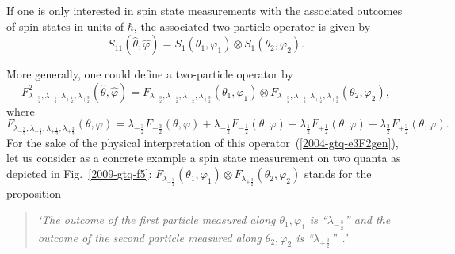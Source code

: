 \documentclass[pra,amsfonts,showpacs,showkeys,preprint]{revtex4}
\begin{document}
If one is only interested in spin state measurements with the associated outcomes of spin states in units of $\hbar$,
the associated two-particle operator is given by
\begin{equation}
 S_{1 1 } ({\hat \theta},{\hat \varphi} ) =
S_{1 }( \theta_1,\varphi_1 )
\otimes
S_{1 }( \theta_2,\varphi_2 ).
\label{2004-gtq-e3F2nat}
\end{equation}

More generally, one could define a two-particle operator by
\begin{equation}
F^2_{\lambda_{-\frac{3}{2}},\lambda_{-\frac{1}{2}}, \lambda_{+\frac{1}{2}}, \lambda_{+\frac{3}{2}} } ({\hat \theta},{\hat \varphi} ) =
F_{\lambda_{-\frac{3}{2}},\lambda_{-\frac{1}{2}}, \lambda_{+\frac{1}{2}}, \lambda_{+\frac{3}{2}} } ( \theta_1,\varphi_1)
\otimes
F_{\lambda_{-\frac{3}{2}},\lambda_{-\frac{1}{2}}, \lambda_{+\frac{1}{2}}, \lambda_{+\frac{3}{2}} } ( \theta_2,\varphi_2 ),
\label{2004-gtq-e3F2gen}
\end{equation}
where
\begin{equation}
F_{\lambda_{-\frac{3}{2}},\lambda_{-\frac{1}{2}}, \lambda_{+\frac{1}{2}}, \lambda_{+\frac{3}{2}} } ( \theta ,\varphi )
=
 \lambda_{-\frac{3}{2}}F_{-\frac{3}{2}}(\theta ,\varphi) +  \lambda_{-\frac{1}{2}} F_{-\frac{1}{2}}(\theta ,\varphi) +
 \lambda_{\frac{1}{2}}F_{+\frac{1}{2}}(\theta ,\varphi)+  \lambda_{\frac{3}{2}}F_{+\frac{3}{2}}(\theta ,\varphi)
.
\label{2004-gtq-e3F2gen2}
\end{equation}
For the sake of the physical interpretation of this operator~(\ref{2004-gtq-e3F2gen}), let us consider as a concrete example
a spin state measurement on two quanta as depicted in Fig.~\ref{2009-gtq-f5}:
$ F_{\lambda_{-\frac{3}{2}}}(\theta_1 ,\varphi_1)\otimes   F_{\lambda_{+\frac{3}{2}}}(\theta_2 ,\varphi_2 )$  stands for the proposition
\begin{quote}
{\em `The outcome of the first particle measured along $\theta_1,\varphi_1$ is ``$\lambda_{-\frac{3}{2}}$''
      and
      the outcome of the second particle measured along $\theta_2,\varphi_2$ is ``$\lambda_{+\frac{3}{2}}$''~.'
}
\end{quote}
\end{document}
